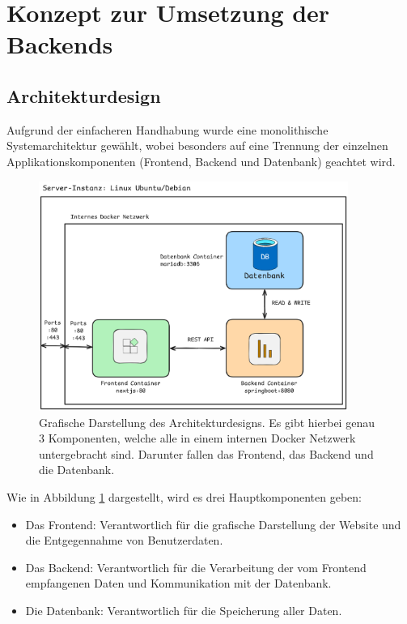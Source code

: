 \section{Konzept zur Umsetzung der Backends}

\subsection{Architekturdesign}
Aufgrund der einfacheren Handhabung wurde eine monolithische Systemarchitektur gewählt, wobei besonders auf eine Trennung der einzelnen Applikationskomponenten (Frontend, Backend und Datenbank) geachtet wird.

\begin{figure}
	\centering
	\includegraphics[width=0.9\textwidth]{images/architectural-design.png}
	\caption{Grafische Darstellung des Architekturdesigns. Es gibt hierbei genau 3 Komponenten, welche alle in einem internen Docker Netzwerk untergebracht sind. Darunter fallen das Frontend, das Backend und die Datenbank.}
    \label{koncept-archdesign-backend}
\end{figure}

Wie in Abbildung \ref{koncept-archdesign-backend} dargestellt, wird es drei Hauptkomponenten geben:

\begin{itemize}
	\item Das Frontend: Verantwortlich für die grafische Darstellung der Website und die Entgegennahme von Benutzerdaten.
	\item Das Backend: Verantwortlich für die Verarbeitung der vom Frontend empfangenen Daten und Kommunikation mit der Datenbank.
	\item Die Datenbank: Verantwortlich für die Speicherung aller Daten.
\end{itemize}

